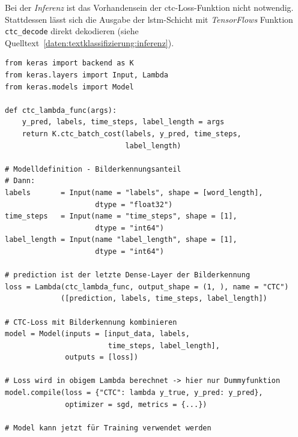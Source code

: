 Bei der \textit{Inferenz} ist das Vorhandensein der \gls{ctc}-Loss-Funktion nicht notwendig. Stattdessen lässt sich die
Ausgabe der \gls{lstm}-Schicht mit \textit{TensorFlows} Funktion \texttt{ctc\_decode} direkt dekodieren (siehe
Quelltext~\ref{daten:textklassifizierung:inferenz}).

\begin{code}
\begin{verbatim}
from keras import backend as K
from keras.layers import Input, Lambda
from keras.models import Model

def ctc_lambda_func(args):
    y_pred, labels, time_steps, label_length = args
    return K.ctc_batch_cost(labels, y_pred, time_steps,
                            label_length)

# Modelldefinition - Bilderkennungsanteil
# Dann:
labels       = Input(name = "labels", shape = [word_length],
                     dtype = "float32")
time_steps   = Input(name = "time_steps", shape = [1],
                     dtype = "int64")
label_length = Input(name "label_length", shape = [1],
                     dtype = "int64")

# prediction ist der letzte Dense-Layer der Bilderkennung
loss = Lambda(ctc_lambda_func, output_shape = (1, ), name = "CTC")
             ([prediction, labels, time_steps, label_length])

# CTC-Loss mit Bilderkennung kombinieren
model = Model(inputs = [input_data, labels,
                        time_steps, label_length],
              outputs = [loss])

# Loss wird in obigem Lambda berechnet -> hier nur Dummyfunktion
model.compile(loss = {"CTC": lambda y_true, y_pred: y_pred},
              optimizer = sgd, metrics = {...})

# Model kann jetzt für Training verwendet werden
\end{verbatim}
\label{daten:textklassifizierung:training}
\end{code}

